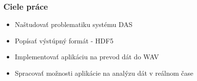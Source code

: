 \documentclass[%
  12pt,       				%
	t,                  %
	aspectratio=1610,   %
	unicode,						%
]{beamer}				    	%
\begin{document}
\disablenavigationsymbols

\maketitle

\begin{frame} 
	\frametitle{Ciele práce}
	\begin{itemize}
			\item Naštudovať problematiku systému DAS
			\item Popísať výstúpný formát - HDF5 
			\item Implementovať aplikáciu na prevod dát do WAV
			\item Spracovať možnosti aplikácie na analýzu dát v reálnom čase
	\end{itemize}
\end{frame}





\end{document}
